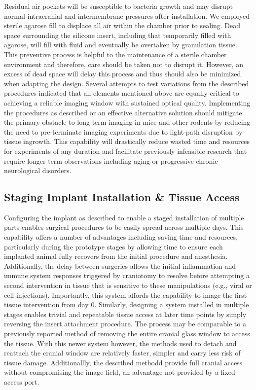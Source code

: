 \documentclass[../main.tex]{subfiles}
\begin{document}
Residual air pockets will be susceptible to bacteria growth and may disrupt normal intracranial and intermembrane pressures after installation.
We employed sterile agarose fill to displace all air within the chamber prior to sealing.
Dead space surrounding the silicone insert, including that temporarily filled with agarose, will fill with fluid and eventually be overtaken by granulation tissue.
This preventive process is helpful to the maintenance of a sterile chamber environment and therefore, care should be taken not to disrupt it.
However, an excess of dead space will delay this process and thus should also be minimized when adapting the design.
Several attempts to test variations from the described procedures indicated that all elements mentioned above are equally critical to achieving a reliable imaging window with sustained optical quality.
Implementing the procedures as described or an effective alternative solution should mitigate the primary obstacle to long-term imaging in mice and other rodents by reducing the need to pre-terminate imaging experiments due to light-path disruption by tissue ingrowth.
This capability will drastically reduce wasted time and resources for experiments of any duration and facilitate previously infeasible research that require longer-term observations including aging or progressive chronic neurological disorders.

\subsection{Staging Implant Installation \& Tissue Access}
\label{sec:staging-implant-installation-tissue-access}

Configuring the implant as described to enable a staged installation of multiple parts enables surgical procedures to be easily spread across multiple days.
This capability offers a number of advantages including saving time and resources, particularly during the prototype stages by allowing time to ensure each implanted animal fully recovers from the initial procedure and anesthesia.
Additionally, the delay between surgeries allows the initial inflammation and immune system responses triggered by craniotomy to resolve before attempting a second intervention in tissue that is sensitive to these manipulations (e.g., viral or cell injections).
Importantly, this system affords the capability to image the first tissue intervention from day 0.
Similarly, designing a system installed in multiple stages enables trivial and repeatable tissue access at later time points by simply reversing the insert attachment procedure.
The process may be comparable to a previously reported method of removing the entire cranial glass window to access the tissue.
With this newer system however, the methods used to detach and reattach the cranial window are relatively faster, simpler and carry less risk of tissue damage.
Additionallly, the described methodd provide full cranial access without compromising the image field, an advantage not provided by a fixed access port.
\end{document}
